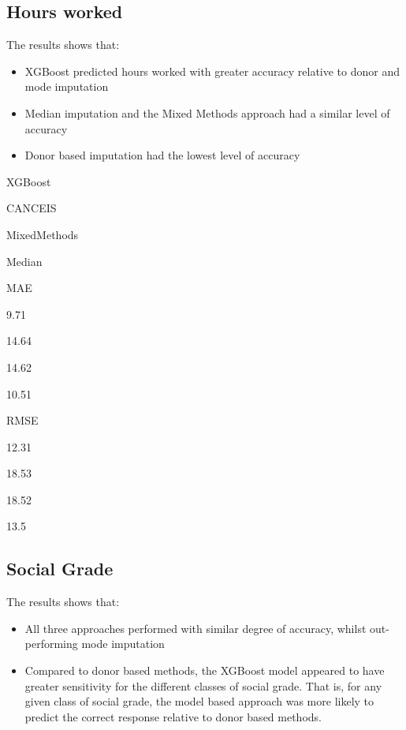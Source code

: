 \documentclass[]{book}
\providecommand{\tightlist}{%
  \setlength{\itemsep}{0pt}\setlength{\parskip}{0pt}}
\begin{document}
\subsection{Hours worked}\label{hours-worked}

The results shows that:

\begin{itemize}
\tightlist
\item
  XGBoost predicted hours worked with greater accuracy relative to donor
  and mode imputation\\
\item
  Median imputation and the Mixed Methods approach had a similar level
  of accuracy\\
\item
  Donor based imputation had the lowest level of accuracy
\end{itemize}

XGBoost

CANCEIS

MixedMethods

Median

MAE

9.71

14.64

14.62

10.51

RMSE

12.31

18.53

18.52

13.5

\subsection{Social Grade}\label{social-grade}

The results shows that:

\begin{itemize}
\tightlist
\item
  All three approaches performed with similar degree of accuracy, whilst
  out-performing mode imputation\\
\item
  Compared to donor based methods, the XGBoost model appeared to have
  greater sensitivity for the different classes of social grade. That
  is, for any given class of social grade, the model based approach was
  more likely to predict the correct response relative to donor based
  methods.
\end{itemize}
\end{document}
